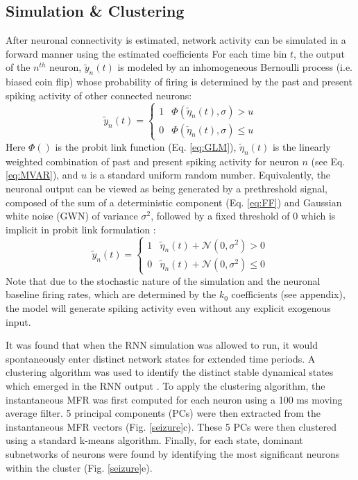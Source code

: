 \documentclass[11pt,a4paper,final]{article}
\begin{document}
\subsection{Simulation \& Clustering}
After neuronal connectivity is estimated, network activity can be simulated in a forward manner using the estimated coefficients 
For each time bin $t$, the output of the $n^{th}$ neuron, $\tilde{y}_n(t)$ is modeled by an inhomogeneous Bernoulli process (i.e. biased coin flip) whose probability of firing is determined by the past and present spiking activity of other connected neurons: 
\begin{equation}
\tilde{y}_n(t) =
\begin{cases}
1   & \Phi(\tilde{\eta}_n(t),\sigma) > u        \\
0   & \Phi(\tilde{\eta}_n(t),\sigma) \leq u
\end{cases}
\label{eq:simul}
\end{equation}
Here $\Phi()$ is the probit link function (Eq. \ref{eq:GLM}), $\tilde{\eta}_n(t)$ is the linearly weighted combination of past and present spiking activity for neuron $n$ (see Eq. \ref{eq:MVAR}), and $u$ is a standard uniform random number.
Equivalently, the neuronal output can be viewed as being generated by a prethreshold signal, composed of the sum of a deterministic component (Eq. \ref{eq:FF}) and Gaussian white noise (GWN) of variance $\sigma^2$, followed by a fixed threshold of 0 which is implicit in probit link formulation \citep{berger12}:
\begin{equation}
\tilde{y}_n(t) =
\begin{cases}
1   & \tilde{\eta}_n(t) + \mathcal{N}(0,\sigma^2) > 0        \\
0   & \tilde{\eta}_n(t) + \mathcal{N}(0,\sigma^2) \leq 0
\end{cases}
\label{eq:simul2}
\end{equation}
Note that due to the stochastic nature of the simulation and the neuronal baseline firing rates, which are determined by the $k_0$ coefficients (see appendix), the model will generate spiking activity even without any explicit exogenous input. 

It was found that when the RNN simulation was allowed to run, it would spontaneously enter distinct network states for extended time periods.
A clustering algorithm was used to identify the distinct stable dynamical states which emerged in the RNN output \citep{sasaki07,santaniello14}.
To apply the clustering algorithm, the instantaneous MFR was first computed for each neuron using a 100 ms moving average filter.
5 principal components (PCs) were then extracted from the \nn{} instantaneous MFR vectors (Fig. \ref{seizure}c).
These 5 PCs were then clustered using a standard k-means algorithm.
Finally, for each state, dominant subnetworks of neurons were found by identifying the most significant neurons within the cluster (Fig. \ref{seizure}e).
\end{document}
